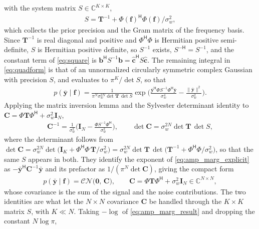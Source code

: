 \documentclass[journal,onecolumn]{IEEEtran}
\begin{document}
with the system matrix $S\in\mathbb{C}^{K\times K}$,
\begin{eqnarray}
\label{eq:sysmat}
S=\mathbf{T}^{-1}+\Phi(\mathbf{f})^{\mathsf H}\Phi(\mathbf{f})/\sigma_w^2,
\end{eqnarray}
which collects the prior precision and the Gram matrix of the frequency basis. Since $\mathbf{T}^{-1}$ is real diagonal and positive and $\Phi^{\mathsf H}\Phi$ is Hermitian positive semi-definite, $S$ is Hermitian positive definite, so $S^{-1}$ exists, $S^{-\mathsf H}=S^{-1}$, and the constant term of \eqref{eq:square} is $\mathbf{b}^{\mathsf H}S^{-1}\mathbf{b}=\hat{\mathbf{c}}^{\mathsf H}S\hat{\mathbf{c}}$. The remaining integral in \eqref{eq:quadform} is that of an unnormalized circularly symmetric complex Gaussian with precision $S$, and evaluates to $\pi^{K}/\det S$, so that
\begin{eqnarray}
\label{eq:amp_marg_explicit}
p(\bar{\mathbf{y}}\mid\mathbf{f})
= \frac{1}{\pi^{N}\sigma_w^{2N}\det\mathbf{T}\,\det S}
  \exp\Big(\frac{\bar{\mathbf{y}}^{\mathsf H}\Phi S^{-1}\Phi^{\mathsf H}\bar{\mathbf{y}}}{\sigma_w^{4}}-\frac{\|\bar{\mathbf{y}}\|^{2}}{\sigma_w^{2}}\Big).
\end{eqnarray}
Applying the matrix inversion lemma and the Sylvester determinant identity to $\mathbf{C}=\Phi\mathbf{T}\Phi^{\mathsf H}+\sigma_w^2\mathbf{I}_N$,
\begin{eqnarray}
\label{eq:woodbury}
\mathbf{C}^{-1}=\frac{1}{\sigma_w^2}\Big(\mathbf{I}_N-\frac{\Phi S^{-1}\Phi^{\mathsf H}}{\sigma_w^2}\Big),
\qquad
\det\mathbf{C}=\sigma_w^{2N}\det\mathbf{T}\,\det S,
\end{eqnarray}
where the determinant follows from
$\det\mathbf{C}=\sigma_w^{2N}\det\big(\mathbf{I}_K+\Phi^{\mathsf H}\Phi\,\mathbf{T}/\sigma_w^{2}\big)
=\sigma_w^{2N}\det\mathbf{T}\,\det\big(\mathbf{T}^{-1}+\Phi^{\mathsf H}\Phi/\sigma_w^{2}\big)$,
so that the same $S$ appears in both. They identify the exponent of \eqref{eq:amp_marg_explicit} as $-\bar{\mathbf{y}}^{\mathsf H}\mathbf{C}^{-1}\bar{\mathbf{y}}$ and its prefactor as $1/(\pi^{N}\det\mathbf{C})$, giving the compact form
\begin{eqnarray}
\label{eq:amp_marg_result}
p(\bar{\mathbf{y}}\mid\mathbf{f})=\mathcal{CN}\big(\mathbf{0},\,\mathbf{C}\big),
\qquad \mathbf{C}=\Phi\mathbf{T}\Phi^{\mathsf H}+\sigma_w^2\mathbf{I}_N\in\mathbb{C}^{N\times N},
\end{eqnarray}
whose covariance is the sum of the signal and the noise contributions. The two identities are what let the $N\times N$ covariance $\mathbf{C}$ be handled through the $K\times K$ matrix $S$, with $K\ll N$. Taking $-\log$ of \eqref{eq:amp_marg_result} and dropping the constant $N\log\pi$,
\end{document}
